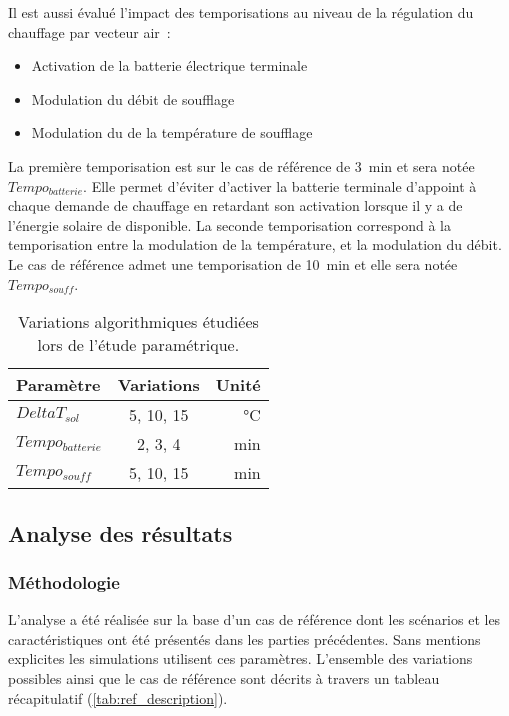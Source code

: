 Il est aussi évalué l’impact des temporisations au niveau de la régulation du chauffage
par vecteur air~:
\begin{itemize}
  \item Activation de la batterie électrique terminale
  \item Modulation du débit de soufflage
  \item Modulation du de la température de soufflage
\end{itemize}

La première temporisation est sur le cas de référence de \SI{3}{min} et sera notée
$Tempo_{batterie}$. Elle permet d’éviter d’activer la batterie terminale d’appoint à
chaque demande de chauffage en retardant son activation lorsque il y a de l’énergie
solaire de disponible. La seconde temporisation correspond à la temporisation entre la
modulation de la température, et la modulation du débit. Le cas de référence admet une
temporisation de \SI{10}{min} et elle sera notée $Tempo_{souff}$.

\begin{table}
\centering
\begin{tabular}{l c r}
    \toprule
    Paramètre          & Variations                    & Unité         \\
    \midrule
    $DeltaT_{sol}$     & \num{5}, \num{10}, \num{15}   & \si{\celsius} \\
    $Tempo_{batterie}$ & \num{2}, \num{3}, \num{4}     & \si{min}      \\
    $Tempo_{souff}$    & \num{5}, \num{10}, \num{15}   & \si{min}      \\
    \bottomrule
\end{tabular}
\caption{Variations algorithmiques étudiées lors de l’étude paramétrique.
         \label{tab:variations_algo}}
\end{table}



\subsection{Analyse des résultats} %
\label{sub:analyse_des_resultats}
\subsubsection{Méthodologie} %
\label{ssub:methodologie}
L’analyse a été réalisée sur la base d’un cas de référence dont les scénarios et les
caractéristiques ont été présentés dans les parties précédentes. Sans mentions explicites les
simulations utilisent ces paramètres. L’ensemble des variations possibles ainsi que
le cas de référence sont décrits à travers un tableau récapitulatif (\autoref{tab:ref_description}).

